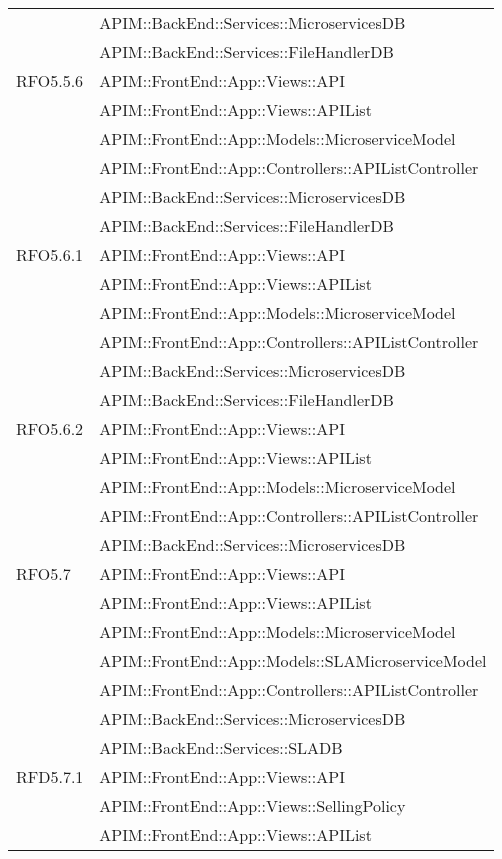 \begin{longtable}{ p{4cm} | p{12cm} }
	& APIM::BackEnd::Services::MicroservicesDB \\
	& APIM::BackEnd::Services::FileHandlerDB \\
	\hline		
	RFO5.5.6
	& APIM::FrontEnd::App::Views::API \\
	& APIM::FrontEnd::App::Views::APIList \\
	& APIM::FrontEnd::App::Models::MicroserviceModel \\
	& APIM::FrontEnd::App::Controllers::APIListController \\
	& APIM::BackEnd::Services::MicroservicesDB \\
	& APIM::BackEnd::Services::FileHandlerDB \\
	\hline		
	RFO5.6.1
	& APIM::FrontEnd::App::Views::API \\
	& APIM::FrontEnd::App::Views::APIList \\
	& APIM::FrontEnd::App::Models::MicroserviceModel \\
	& APIM::FrontEnd::App::Controllers::APIListController \\
	& APIM::BackEnd::Services::MicroservicesDB \\
	& APIM::BackEnd::Services::FileHandlerDB \\
	\hline	
	RFO5.6.2
	& APIM::FrontEnd::App::Views::API \\
	& APIM::FrontEnd::App::Views::APIList \\
	& APIM::FrontEnd::App::Models::MicroserviceModel \\
	& APIM::FrontEnd::App::Controllers::APIListController \\
	& APIM::BackEnd::Services::MicroservicesDB \\
	\hline	
	RFO5.7
	& APIM::FrontEnd::App::Views::API \\
	& APIM::FrontEnd::App::Views::APIList \\
	& APIM::FrontEnd::App::Models::MicroserviceModel \\
	& APIM::FrontEnd::App::Models::SLAMicroserviceModel \\
	& APIM::FrontEnd::App::Controllers::APIListController \\
	& APIM::BackEnd::Services::MicroservicesDB \\
	& APIM::BackEnd::Services::SLADB \\
	\hline		
	RFD5.7.1
	& APIM::FrontEnd::App::Views::API \\
	& APIM::FrontEnd::App::Views::SellingPolicy \\
	& APIM::FrontEnd::App::Views::APIList \\

\end{longtable}

